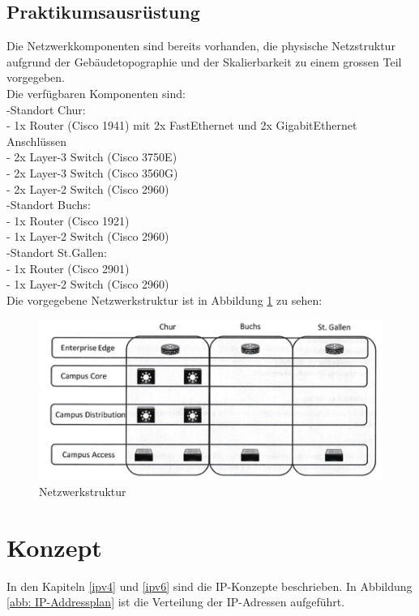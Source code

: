 \documentclass[11pt,a4paper]{scrreprt}
\begin{document}
\section{Praktikumsausrüstung} 
Die Netzwerkkomponenten sind bereits vorhanden, die physische Netzstruktur aufgrund der Gebäudetopographie und der Skalierbarkeit zu einem grossen Teil vorgegeben.\\
\newline
Die verfügbaren Komponenten sind:\\
\newline
-Standort Chur:\\
- 1x Router (Cisco 1941) mit 2x FastEthernet und 2x GigabitEthernet Anschlüssen\\
- 2x Layer-3 Switch (Cisco 3750E)\\
- 2x Layer-3 Switch (Cisco 3560G)\\
- 2x Layer-2 Switch (Cisco 2960)\\
\newline
-Standort Buchs:\\
- 1x Router (Cisco 1921)\\
- 1x Layer-2 Switch (Cisco 2960)\\
\newline
-Standort St.Gallen:\\
- 1x Router (Cisco 2901)\\
- 1x Layer-2 Switch (Cisco 2960)\\
\newline
Die vorgegebene Netzwerkstruktur ist in Abbildung \ref{abb: Netzwerksturktur} zu sehen:
\begin{figure} [H]
\centering
\includegraphics{Netzwerkstruktur.png}
\caption{Netzwerkstruktur}
\label{abb: Netzwerksturktur}
\end{figure}
\newpage

\chapter{Konzept}
In den Kapiteln \ref{ipv4} und \ref{ipv6} sind die IP-Konzepte beschrieben. In Abbildung \ref{abb: IP-Addressplan} ist die Verteilung der IP-Adressen aufgeführt.
\end{document}
